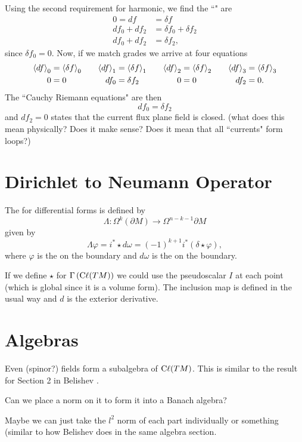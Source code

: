 Using the second requirement for harmonic, we find the ``" are
\begin{align*}
    0=df&=\delta f\\
    df_0 + df_2 &= \delta f_0 + \delta f_2\\
    df_0 + df_2 &= \delta f_2,
\end{align*}
since $\delta f_0=0$.  Now, if we match grades we arrive at four equations
\begin{align*}
    \left\langle df\right\rangle_0&=\left\langle\delta f\right\rangle_0 &&& \left\langle df\right\rangle_1&=\left\langle\delta f\right\rangle_1 &&& \left\langle df\right\rangle_2&= \left\langle\delta f\right\rangle_2 &&& \left\langle df\right\rangle_3&= \left\langle\delta f\right\rangle_3\\
    0 &= 0 &&& df_0 &= \delta f_2 &&& 0&=0 &&& df_2 &= 0.
\end{align*}
The ``Cauchy Riemann equations" are then
\[
df_0= \delta f_2
\]
and $df_2 =0$ states that the current flux plane field is closed. (what does this mean physically? Does it make sense? Does it mean that all ``currents" form loops?) 

\section{Dirichlet to Neumann Operator}

The  for differential forms is defined by
\[
\Lambda \colon \Omega^k(\partial M) \to \Omega^{n-k-1}{\partial M}
\]
given by
\[
\Lambda \varphi = i^* \star d \omega=(-1)^{k+1}i^*(\delta \star \varphi),
\]
where $\varphi$ is the  on the boundary and $d\omega$ is the  on the boundary.

If we define $\star$ for $\Gamma\left(\mathrm{C}\ell(TM)\right)$ we could use the pseudoscalar $I$ at each point (which is global since it is a volume form). The inclusion map is defined in the usual way and $d$ is the exterior derivative.  

\section{Algebras}
Even (spinor?) fields form a subalgebra of $\mathrm{C}\ell(TM)$.  This is similar to the result for Section 2 in Belishev \cite{belishev_quaternion}. 
\begin{question}
Can we place a norm on it to form it into a Banach algebra? 
\end{question}

Maybe we can just take the $l^2$ norm of each part individually or something (similar to how Belishev does in the same algebra section.

